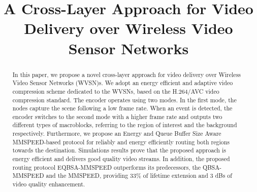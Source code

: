 \documentclass[conference,a4paper]{IEEEtran}
\begin{document}
\title{A Cross-Layer Approach for Video Delivery over Wireless Video Sensor Networks}






\author{
}












\maketitle


\begin{abstract}
In this paper, we propose a novel cross-layer approach for video delivery over Wireless Video Sensor Networks (WVSN)s.  We adopt an energy efficient and adaptive video compression scheme dedicated to the WVSNs, based on the H.264/AVC video compression standard. The encoder operates using two modes.  In the first mode, the nodes capture the scene following a low frame rate. When an event is detected, the encoder switches to the second mode with a higher frame rate and outputs two different types of macroblocks, referring to the region of interest and the background respectively. Furthermore, we propose an Energy and Queue Buffer Size Aware MMSPEED-based protocol for reliably and energy efficiently routing both regions towards the destination. Simulations results prove that the proposed approach is energy efficient and delivers good quality video streams. In addition, the proposed routing protocol EQBSA-MMSPEED outperforms its predecessors, the QBSA-MMSPEED and the MMSPEED, providing 33\% of lifetime extension and 3 dBs of video quality enhancement.
\end{abstract}
\end{document}
